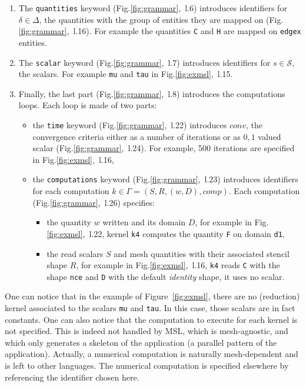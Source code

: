 \begin{enumerate}
\item The \texttt{quantities} keyword (Fig.\ref{fig:grammar},~l.6) introduces identifiers for $\delta\in\Delta$, the quantities with the group of entities they are mapped on (Fig.\ref{fig:grammar},~l.16). For example the quantities \texttt{C} and \texttt{H} are mapped on \texttt{edgex} entities.

\item The \texttt{scalar} keyword (Fig.\ref{fig:grammar},~l.7) introduces identifiers for $s\in\mathcal{S}$, the scalars. For example \texttt{mu} and \texttt{tau} in Fig.\ref{fig:exmsl},~l.15. 

\item Finally, the last part (Fig.\ref{fig:grammar},~l.8) introduces the computations loops. Each loop is made of two parts:
\begin{itemize}
\item the \texttt{time} keyword (Fig.\ref{fig:grammar},~l.22) introduces $conv$, the convergence criteria either as a number of iterations or as ${0,1}$ valued scalar (Fig.\ref{fig:grammar},~l.24). For example, 500 iterations are specified in Fig.\ref{fig:exmsl},~l.16,
\item the \texttt{computations} keyword (Fig.\ref{fig:grammar},~l.23) introduces identifiers for each computation $k\in\Gamma=(S,R,(w,D),comp)$. Each computation (Fig.\ref{fig:grammar},~l.26) specifies:
\begin{itemize}
 \item the quantity $w$ written and its domain $D$, for example in Fig.\ref{fig:exmsl},~l.22, kernel \texttt{k4} computes the quantity \texttt{F} on domain \texttt{d1},
 \item the read scalars $S$ and mesh quantities with their associated stencil shape $R$, for example in Fig.\ref{fig:exmsl},~l.16, \texttt{k4} reads \texttt{C} with the shape \texttt{nce} and \texttt{D} with the default \textit{identity} shape, it uses no scalar.
 \end{itemize}
\end{itemize}
\end{enumerate}

One can notice that in the example of Figure~\ref{fig:exmsl}, there are no (reduction) kernel associated to the scalars \texttt{mu} and \texttt{tau}.
In this case, those scalars are in fact constants.
One can also notice that the computation to execute for each kernel is not specified.
This is indeed not handled by MSL, which is mesh-agnostic, and which only generates a skeleton of the application (a parallel pattern of the application). Actually, a numerical computation is naturally mesh-dependent and is left to other languages. The numerical computation is specified elsewhere by referencing the identifier chosen here.

